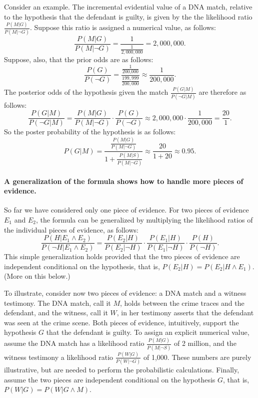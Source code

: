 \documentclass[10pt]{article}
\begin{document}
Consider an example. The incremental evidential value of a DNA match, relative to the hypothesis 
that the defendant is guilty, is given by the the likelihood ratio $\frac{P(M |G)}{P( M | \neg G)}$. 
Suppose this ratio is assigned a numerical value,  as follows:
%
\[\frac{P(M |G)}{P( M | \neg G)}=\frac{1}{\frac{1}{2,000,000}}=2, 000,000.\]
% 
Suppose, also, that the prior odds are as follows:
%
\[\frac{P(G)}{P(\neg G)}=\frac{\frac{1}{\text{200,000}}}{\frac{199,999}{200,000}}\approx \frac{1}{200,000}.\]
% 
The posterior odds of the hypothesis given the match $\frac{P(G|M)}{P(\neg G|M)}$ are therefore as follows:
%
\[\frac{P(G|M)}{P(\neg G|M)}= \frac{P(M |G)}{P( M | \neg G)}\cdot \frac{P(G)}{P(\neg G)} \approx 2,000,000 \cdot \frac{1}{200,000}=\frac{20}{1}.\]
% 
So the poster probability of the hypothesis is as follows:
%
\[P(G|M)= \frac{\frac{P(M|G)}{P(M|\neg G)}}{1+ \frac{P(M|S)}{P(M|\neg G)}} \approx \frac{20}{1+20}\approx 0.95.\]
%
 


\paragraph{A generalization of the formula shows how to handle more pieces of evidence.} 
So far we have considered only one piece of evidence. 
For two pieces of evidence $E_1$ and $E_2$, the formula can be generalized 
by multiplying the likelihood ratios of the individual pieces of evidence, as follows:
	\[ \frac{P(H|E_1 \land E_2)}{P(\neg H | E_1 \land E_2)} = 
	\frac{P(E_2 | H)}{P(E_2| \neg H)}
	\cdot 
	\frac{P(E_1 | H)}{P(E_1| \neg H)}
	\cdot 
	\frac{P(H)}{P(\neg H)}.\]
This simple generalization holds provided that the two pieces of evidence are 
independent conditional on the hypothesis, that is, $P(E_2| H)=P(E_2| H \wedge E_1)$. 
(More on this below.) 

To illustrate, consider now two pieces of evidence: a DNA match and a witness testimony.
The DNA match, call it $M$, holds between the crime traces and the defendant, and 
the witness, call it $W$, in her testimony asserts that the defendant was 
seen at the crime scene.  
Both pieces of evidence, intuitively, support the hypothesis $G$ that the defendant 
is guilty. To assign an explicit numerical value, assume
 the DNA match has a likelihood ratio $\frac{P(M | G)}{P( M | \neg S)}$ of 2 million, 
and the witness testimony a likelihood ratio $\frac{P(W | G)}{P( W | \neg G)}$ of 1,000. 
These numbers are purely illustrative, but are needed to perform the probabilistic calculations.  Finally, assume the two pieces are independent conditional on the hypothesis $G$, that is, 
$P(W|G)=P(W| G\wedge M)$. 
\end{document}
